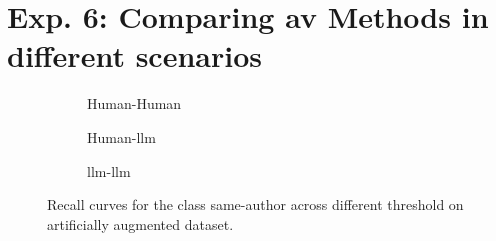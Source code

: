 \section{Exp. 6: Comparing \ac{av} Methods in different scenarios}
\label{sec:app_detection_scenarios}

%     


\begin{figure}[htbp]
  \centering
  \begin{subfigure}[b]{0.52\textwidth}
    \centering
    
    \caption{Human-Human}
    \label{fig:detec_scen_human-human_recall}
  \end{subfigure}
  \hfill
  \begin{subfigure}[b]{0.52\textwidth}
    \centering
    
    \caption{Human-\ac{llm}}
    \label{fig:detec_scen_human-llm_recall}
  \end{subfigure}
  \hfill
  \begin{subfigure}[b]{0.52\textwidth}
    \centering
    
    \caption{\ac{llm}-\ac{llm}}
    \label{fig:detec_scen_llm-llm_recall}
    \end{subfigure}
  \caption{Recall curves for the class same-author across different threshold on artificially augmented \dataStudent{} dataset.}
  \label{fig:detec_scen_recall}
\end{figure}
